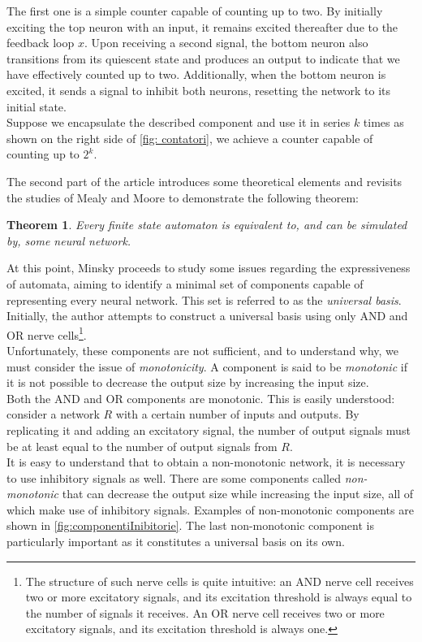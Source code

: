 \documentclass[10pt]{article}
\newtheorem{thm}{Theorem}
\begin{document}
\begin{itemize}
The first one is a simple counter capable of counting up to two. By initially exciting the top neuron with an input, it remains excited thereafter due to the feedback loop $x$. Upon receiving a second signal, the bottom neuron also transitions from its quiescent state and produces an output to indicate that we have effectively counted up to two. Additionally, when the bottom neuron is excited, it sends a signal to inhibit both neurons, resetting the network to its initial state.\\
Suppose we encapsulate the described component and use it in series $k$ times as shown on the right side of \autoref{fig: contatori}, we achieve a counter capable of counting up to $2^k$.
\end{itemize}



The second part of the article introduces some theoretical elements and revisits the studies of Mealy and Moore to demonstrate the following theorem:

\begin{thm}
	Every finite state automaton is equivalent to, and can be simulated by, some neural network.
\end{thm}

At this point, Minsky proceeds to study some issues regarding the expressiveness of automata, aiming to identify a minimal set of components capable of representing every neural network. This set is referred to as the \emph{universal basis}.\\
Initially, the author attempts to construct a universal basis using only AND and OR nerve cells\footnote{The structure of such nerve cells is quite intuitive: an AND nerve cell receives two or more excitatory signals, and its excitation threshold is always equal to the number of signals it receives. An OR nerve cell receives two or more excitatory signals, and its excitation threshold is always one.}.\\
Unfortunately, these components are not sufficient, and to understand why, we must consider the issue of \emph{monotonicity}. A component is said to be \emph{monotonic} if it is not possible to decrease the output size by increasing the input size.\\
Both the AND and OR components are monotonic. This is easily understood: consider a network $R$ with a certain number of inputs and outputs. By replicating it and adding an excitatory signal, the number of output signals must be at least equal to the number of output signals from $R$.\\
It is easy to understand that to obtain a non-monotonic network, it is necessary to use inhibitory signals as well. There are some components called \emph{non-monotonic} that can decrease the output size while increasing the input size, all of which make use of inhibitory signals. Examples of non-monotonic components are shown in \autoref{fig:componentiInibitorie}. The last non-monotonic component is particularly important as it constitutes a universal basis on its own.\\
\end{document}
